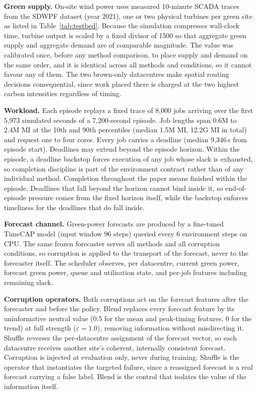 \documentclass{article} %
\begin{document}
\textbf{Green supply.} On-site wind power uses measured 10-minute SCADA traces from the SDWPF dataset (year 2021), one or two physical turbines per green site as listed in Table~\ref{tab:testbed}. Because the simulation compresses wall-clock time, turbine output is scaled by a fixed divisor of 1500 so that aggregate green supply and aggregate demand are of comparable magnitude. The value was calibrated once, before any method comparison, to place supply and demand on the same order, and it is identical across all methods and conditions, so it cannot favour any of them. The two brown-only datacentres make spatial routing decisions consequential, since work placed there is charged at the two highest carbon intensities regardless of timing.

\textbf{Workload.} Each episode replays a fixed trace of 8{,}000 jobs arriving over the first 5{,}973 simulated seconds of a 7{,}200-second episode. Job lengths span 0.6M to 2.4M MI at the 10th and 90th percentiles (median 1.5M MI, 12.2G MI in total) and request one to four cores. Every job carries a deadline (median 9{,}346\,s from episode start). Deadlines may extend beyond the episode horizon. Within the episode, a deadline backstop forces execution of any job whose slack is exhausted, so completion discipline is part of the environment contract rather than of any individual method. Completion throughout the paper means finished within the episode. Deadlines that fall beyond the horizon cannot bind inside it, so end-of-episode pressure comes from the fixed horizon itself, while the backstop enforces timeliness for the deadlines that do fall inside.

\textbf{Forecast channel.} Green-power forecasts are produced by a fine-tuned TimeCAP model (input window 96 steps) queried every 6 environment steps on CPU. The same frozen forecaster serves all methods and all corruption conditions, so corruption is applied to the transport of the forecast, never to the forecaster itself. The scheduler observes, per datacentre, current green power, forecast green power, queue and utilisation state, and per-job features including remaining slack.

\textbf{Corruption operators.} Both corruptions act on the forecast features after the forecaster and before the policy. Blend replaces every forecast feature by its uninformative neutral value (0.5 for the mean and peak-timing features, 0 for the trend) at full strength ($\varepsilon{=}1.0$), removing information without misdirecting it. Shuffle reverses the per-datacentre assignment of the forecast vector, so each datacentre receives another site's coherent, internally consistent forecast. Corruption is injected at evaluation only, never during training. Shuffle is the operator that instantiates the targeted failure, since a reassigned forecast is a real forecast carrying a false label. Blend is the control that isolates the value of the information itself.
\end{document}
